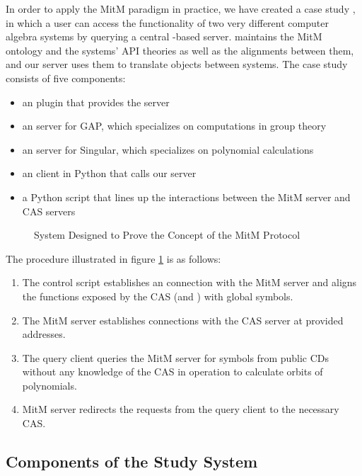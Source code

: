 In order to apply the MitM paradigm in practice, we have created a case study 
\cite{MitM-PoC}, in which a user can access the functionality of two very 
different computer algebra systems by querying a central \MMT-based server.
\MMT maintains the MitM ontology and the systems' API theories as well as the alignments between them, and our server uses them to translate objects between systems.
The case study consists of five components:

\begin{itemize}
  \item an \MMT plugin that provides the server
  \item an \SCSCP server for GAP, which specializes on computations in group theory
  \item an \SCSCP server for Singular, which specializes on polynomial calculations
  \item an \SCSCP client in Python that calls our server
  \item a Python script that lines up the interactions between the MitM server and CAS servers
\end{itemize}

\begin{figure}[ht]\centering\vspace*{-1em}
  \caption[\GAP-\Singular MitM Interaction]{
    System Designed to Prove the Concept of the MitM Protocol
  }\label{fig:mitmpoc}\vspace*{-1em}
\end{figure}

The procedure illustrated in figure \ref{fig:mitmpoc} is as follows:
\begin{enumerate}
  \item The control script establishes an \SCSCP connection with the \MMT MitM 
    server and aligns the functions exposed by the CAS (\GAP and \Singular) with
    global symbols.
  \item The MitM server establishes \SCSCP connections with the CAS server at
    provided addresses.
  \item The query client queries the MitM server for symbols from public CDs
    without any knowledge of the CAS in operation to calculate orbits of 
    polynomials.
  \item MitM server redirects the requests from the query client to the necessary
    CAS.
\end{enumerate}

\subsection{Components of the Study System}

